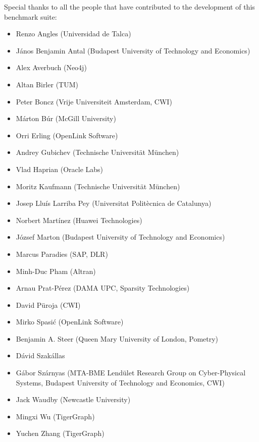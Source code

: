 Special thanks to all the people that have contributed to the development of this benchmark suite:
\begin{itemize}
  \item Renzo Angles (Universidad de Talca)
  \item J\'anos Benjamin Antal (Budapest University of Technology and Economics)
  \item Alex Averbuch (Neo4j)
  \item Altan Birler (TUM)
  \item Peter Boncz (Vrije Universiteit Amsterdam, CWI)
  \item M\'arton B\'ur (McGill University)
  \item Orri Erling (OpenLink Software)
  \item Andrey Gubichev (Technische Universit\"at M\"unchen)
  \item Vlad Haprian (Oracle Labs)
  \item Moritz Kaufmann (Technische Universit\"at M\"unchen)
  \item Josep Llu\'is Larriba Pey (Universitat Polit\`ecnica de Catalunya)
  \item Norbert Mart\'inez (Huawei Technologies)
  \item J\'ozsef Marton (Budapest University of Technology and Economics)
  \item Marcus Paradies (SAP, DLR)
  \item Minh-Duc Pham (Altran)
  \item Arnau Prat-P\'erez (DAMA UPC, Sparsity Technologies)
  \item David P\"uroja (CWI)
  \item Mirko Spasi\'c (OpenLink Software)
  \item Benjamin A. Steer (Queen Mary University of London, Pometry)
  \item D\'avid Szak\'allas
  \item G\'abor Sz\'arnyas (MTA-BME Lend\"ulet Research Group on Cyber-Physical Systems, Budapest University of Technology and Economics, CWI)
  \item Jack Waudby (Newcastle University)
  \item Mingxi Wu (TigerGraph)
  \item Yuchen Zhang (TigerGraph)
\end{itemize}
